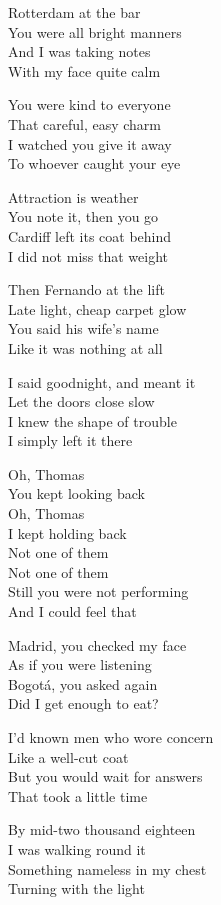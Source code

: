\begin{lyrics}
Rotterdam at the bar\\
You were all bright manners\\
And I was taking notes\\
With my face quite calm

You were kind to everyone\\
That careful, easy charm\\
I watched you give it away\\
To whoever caught your eye

Attraction is weather\\
You note it, then you go\\
Cardiff left its coat behind\\
I did not miss that weight

Then Fernando at the lift\\
Late light, cheap carpet glow\\
You said his wife’s name\\
Like it was nothing at all

I said goodnight, and meant it\\
Let the doors close slow\\
I knew the shape of trouble\\
I simply left it there

Oh, Thomas\\
You kept looking back\\
Oh, Thomas\\
I kept holding back\\
Not one of them\\
Not one of them\\
Still you were not performing\\
And I could feel that

Madrid, you checked my face\\
As if you were listening\\
Bogotá, you asked again\\
Did I get enough to eat?

I’d known men who wore concern\\
Like a well-cut coat\\
But you would wait for answers\\
That took a little time

By mid-two thousand eighteen\\
I was walking round it\\
Something nameless in my chest\\
Turning with the light


\end{lyrics}
